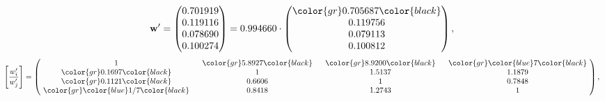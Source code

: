 \begin{example}
\begin{equation*}
\mathbf{w}^{\prime} =
\begin{pmatrix}
0.701919\\
0.119116\\
0.078690\\
0.100274
\end{pmatrix} =
0.994660\cdot
\begin{pmatrix}
\color{gr} 0.705687\color{black} \\
0.119756\\
0.079113\\
0.100812
\end{pmatrix},
\end{equation*}
\begin{equation*}
\left[ \frac{{w}^{\prime}_i}{{w}^{\prime}_j} \right] =
\begin{pmatrix}
$\,\,$ 1 $\,\,$ & $\,\,$\color{gr} 5.8927\color{black} $\,\,$ & $\,\,$\color{gr} 8.9200\color{black} $\,\,$ & $\,\,$\color{gr} \color{blue} 7\color{black} $\,\,$ \\
$\,\,$\color{gr} 0.1697\color{black} $\,\,$ & $\,\,$ 1 $\,\,$ & $\,\,$1.5137$\,\,$ & $\,\,$1.1879  $\,\,$ \\
$\,\,$\color{gr} 0.1121\color{black} $\,\,$ & $\,\,$0.6606$\,\,$ & $\,\,$ 1 $\,\,$ & $\,\,$0.7848 $\,\,$ \\
$\,\,$\color{gr} \color{blue}  1/7\color{black} $\,\,$ & $\,\,$0.8418$\,\,$ & $\,\,$1.2743$\,\,$ & $\,\,$ 1  $\,\,$ \\
\end{pmatrix},
\end{equation*}
\end{example}
